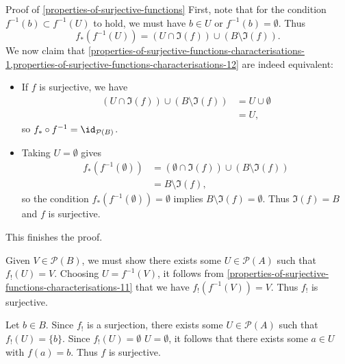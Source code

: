 \begin{Proof}{Proof of \cref{properties-of-surjective-functions}}
    First, note that for the condition $f^{-1}(b)\subset f^{-1}(U)$ to hold, we must have $b\in U$ or $f^{-1}(b)=\emptyset$. Thus
    \[
        f_{*}(f^{-1}(U))%
        =%
        (U\cap\Im(f))%
        \cup%
        (B\setminus\Im(f)).%
    \]%
    We now claim that \cref{properties-of-surjective-functions-characterisations-1,properties-of-surjective-functions-characterisations-12} are indeed equivalent:
    \begin{itemize}
        \item{}If $f$ is surjective, we have
            \begin{align*}
                (U\cap\Im(f))\cup(B\setminus\Im(f)) &= U\cup\emptyset\\
                                                    &= U,
            \end{align*}
            so $f_{*}\circ f^{-1}=\id_{\mathcal{P}(B)}$.
        \item{}Taking $U=\emptyset$ gives
            \begin{align*}
                f_{*}(f^{-1}(\emptyset)) &= (\emptyset\cap\Im(f))\cup(B\setminus\Im(f))\\%
                                         &= B\setminus\Im(f),%
            \end{align*}
            so the condition $f_{*}(f^{-1}(\emptyset))=\emptyset$ implies $B\setminus\Im(f)=\emptyset$. Thus $\Im(f)=B$ and $f$ is surjective.
    \end{itemize}
    This finishes the proof.

    Given $V\in\mathcal{P}(B)$, we must show there exists some $U\in\mathcal{P}(A)$ such that $f_{!}(U)=V$. Choosing $U=f^{-1}(V)$, it follows from \cref{properties-of-surjective-functions-characterisations-11} that we have $f_{!}(f^{-1}(V))=V$. Thus $f_{!}$ is surjective.

    Let $b\in B$. Since $f_{!}$ is a surjection, there exists some $U\in\mathcal{P}(A)$ such that $f_{!}(U)=\{b\}$. Since $f_{!}(U)=\emptyset$ \textiff $U=\emptyset$, it follows that there exists some $a\in U$ with $f(a)=b$. Thus $f$ is surjective.


\end{Proof}
